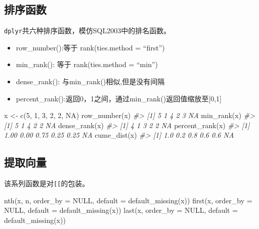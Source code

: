 \documentclass[
]{book}
\newenvironment{Shaded}{\begin{snugshade}}{\end{snugshade}}
\newcommand{\AttributeTok}[1]{\textcolor[rgb]{0.77,0.63,0.00}{#1}}
\newcommand{\CommentTok}[1]{\textcolor[rgb]{0.56,0.35,0.01}{\textit{#1}}}
\newcommand{\ConstantTok}[1]{\textcolor[rgb]{0.00,0.00,0.00}{#1}}
\newcommand{\DecValTok}[1]{\textcolor[rgb]{0.00,0.00,0.81}{#1}}
\newcommand{\FunctionTok}[1]{\textcolor[rgb]{0.00,0.00,0.00}{#1}}
\newcommand{\NormalTok}[1]{#1}
\newcommand{\OtherTok}[1]{\textcolor[rgb]{0.56,0.35,0.01}{#1}}
\providecommand{\tightlist}{%
  \setlength{\itemsep}{0pt}\setlength{\parskip}{0pt}}
\begin{document}
\hypertarget{ux6392ux5e8fux51fdux6570}{%
\subsection{排序函数}\label{ux6392ux5e8fux51fdux6570}}

\texttt{dplyr}共六种排序函数，模仿SQL2003中的排名函数。

\begin{itemize}
\tightlist
\item
  row\_number():等于 rank(ties.method = ``first'')
\item
  min\_rank(): 等于 rank(ties.method = ``min'')
\item
  dense\_rank(): 与min\_rank()相似,但是没有间隔
\item
  percent\_rank():返回0，1之间，通过min\_rank()返回值缩放至{[}0,1{]}
\end{itemize}

\begin{Shaded}
\begin{Highlighting}[]
\NormalTok{x }\OtherTok{\textless{}{-}} \FunctionTok{c}\NormalTok{(}\DecValTok{5}\NormalTok{, }\DecValTok{1}\NormalTok{, }\DecValTok{3}\NormalTok{, }\DecValTok{2}\NormalTok{, }\DecValTok{2}\NormalTok{, }\ConstantTok{NA}\NormalTok{)}
\FunctionTok{row\_number}\NormalTok{(x)}
\CommentTok{\#\textgreater{} [1]  5  1  4  2  3 NA}
\FunctionTok{min\_rank}\NormalTok{(x)}
\CommentTok{\#\textgreater{} [1]  5  1  4  2  2 NA}
\FunctionTok{dense\_rank}\NormalTok{(x)}
\CommentTok{\#\textgreater{} [1]  4  1  3  2  2 NA}
\FunctionTok{percent\_rank}\NormalTok{(x)}
\CommentTok{\#\textgreater{} [1] 1.00 0.00 0.75 0.25 0.25   NA}
\FunctionTok{cume\_dist}\NormalTok{(x)}
\CommentTok{\#\textgreater{} [1] 1.0 0.2 0.8 0.6 0.6  NA}
\end{Highlighting}
\end{Shaded}

\hypertarget{ux63d0ux53d6ux5411ux91cf}{%
\subsection{提取向量}\label{ux63d0ux53d6ux5411ux91cf}}

该系列函数是对\texttt{{[}{[}}的包装。

\begin{Shaded}
\begin{Highlighting}[]
\FunctionTok{nth}\NormalTok{(x, n, }\AttributeTok{order\_by =} \ConstantTok{NULL}\NormalTok{, }\AttributeTok{default =} \FunctionTok{default\_missing}\NormalTok{(x))}
\FunctionTok{first}\NormalTok{(x, }\AttributeTok{order\_by =} \ConstantTok{NULL}\NormalTok{, }\AttributeTok{default =} \FunctionTok{default\_missing}\NormalTok{(x))}
\FunctionTok{last}\NormalTok{(x, }\AttributeTok{order\_by =} \ConstantTok{NULL}\NormalTok{, }\AttributeTok{default =} \FunctionTok{default\_missing}\NormalTok{(x))}
\end{Highlighting}
\end{Shaded}
\end{document}
